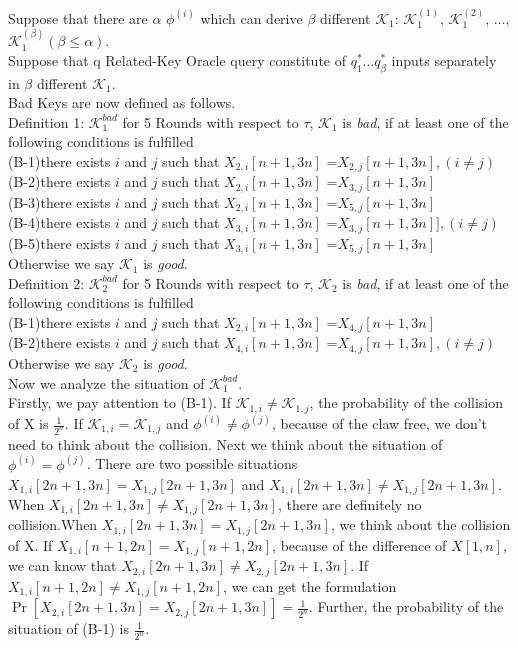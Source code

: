 Suppose that there are $\alpha$ $\phi^{(i)}$ which can derive $\beta$ different $\mathcal{K}_{1}$: $\mathcal{K}_{1}^{(1)}$, $\mathcal{K}_{1}^{(2)}$, $\dots$,$\mathcal{K}_{1}^{(\beta)}$$(\beta\leq \alpha)$.\\
Suppose that q Related-Key Oracle query constitute of $q_{1}^{\ast} \dots q_{\beta}^{\ast}$ inputs separately in $\beta$ different $\mathcal{K}_{1}$.\\

Bad Keys are now defined as follows.\\
Definition 1: $\mathcal{K}_{1}^{bad}$  for 5 Rounds
with respect to $\tau$, $\mathcal{K}_{1}$  is {\it bad}, if at least one of the following conditions is fulfilled\\
(B-1)there exists $i$ and $j$ such that $X_{2,i}[n+1,3n]$ =$X_{2,j}[n+1,3n],(i\neq j)$\\
(B-2)there exists $i$ and $j$ such that $X_{2,i}[n+1,3n]$ =$X_{3,j}[n+1,3n]$\\
(B-3)there exists $i$ and $j$ such that $X_{2,i}[n+1,3n]$ =$X_{5,j}[n+1,3n]$\\
(B-4)there exists $i$ and $j$ such that $X_{3,i}[n+1,3n]$ =$X_{3,j}[n+1,3n]],(i\neq j)$\\
(B-5)there exists $i$ and $j$ such that $X_{3,i}[n+1,3n]$ =$X_{5,j}[n+1,3n]$\\
Otherwise we say $\mathcal{K}_{1}$ is {\it good}.\\

Definition 2: $\mathcal{K}_{2}^{bad}$  for 5 Rounds
with respect to $\tau$, $\mathcal{K}_{2}$  is {\it bad}, if at least one of the following conditions is fulfilled \\
(B-1)there exists $i$ and $j$ such that $X_{2,i}[n+1,3n]$ =$X_{4,j}[n+1,3n]$\\
(B-2)there exists $i$ and $j$ such that $X_{4,i}[n+1,3n]$ =$X_{4,j}[n+1,3n],(i\neq j)$\\
Otherwise we say $\mathcal{K}_{2}$ is {\it good}.\\

Now we analyze the situation of $\mathcal{K}_{1}^{bad}$.\\
Firstly, we pay attention to (B-1). If $\mathcal{K}_{1,i}\neq\mathcal{K}_{1,j}$, the probability of the collision of X is $\frac{1}{2^{n}}$. If $\mathcal{K}_{1,i}=\mathcal{K}_{1,j}$ and $\phi^{(i)}\neq\phi^{(j)}$, because of the claw free, we don't need to think about the collision. Next we think about the situation of $\phi^{(i)}=\phi^{(j)}$. There are two possible situations $X_{1,i}[2n+1,3n]=X_{1,j}[2n+1,3n]$ and $X_{1,i}[2n+1,3n]\neq X_{1,j}[2n+1,3n]$. When $X_{1,i}[2n+1,3n]\neq X_{1,j}[2n+1,3n]$, there are definitely no collision.When $X_{1,i}[2n+1,3n]=X_{1,j}[2n+1,3n]$, we think about the collision of X.
If $X_{1,i}[n+1,2n]=X_{1,j}[n+1,2n]$, because of the difference of $X[1,n]$, we can know that $X_{2,i}[2n+1,3n]\neq X_{2,j}[2n+1,3n]$. If $X_{1,i}[n+1,2n]\neq X_{1,j}[n+1,2n]$, we can get the formulation
$\Pr[X_{2,i}[2n+1,3n]=X_{2,j}[2n+1,3n]]=\frac{1}{2^{n}}$.
Further, the probability of the situation of (B-1) is $\frac{1}{2^{n}}$.

